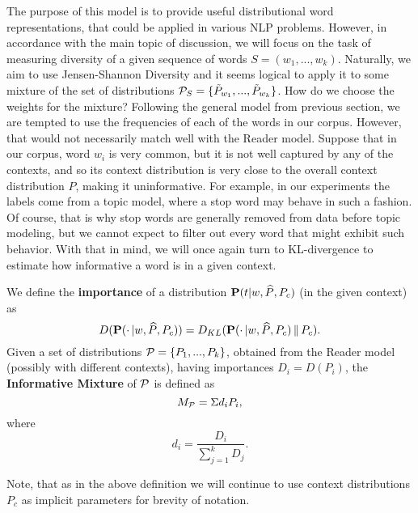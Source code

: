 The purpose of this model is to provide useful distributional
word representations, that could be applied in various NLP
problems. However, in accordance with the main topic of discussion, we will
focus on the task of measuring diversity of a given sequence of words
$S=(w_1,...,w_k)$. Naturally, we aim to use Jensen-Shannon Diversity
and it seems logical to apply it to some mixture of the set of
distributions ${\mathcal P}_S=\{\tilde{P}_{w_1},...,\tilde{P}_{w_k}\}$. How do we choose the weights
for the mixture? Following the general model from previous section, we
are tempted to use the frequencies of each of the words in our
corpus. However, that would not  
necessarily match well with the Reader model. Suppose that in our
corpus, word $w_i$ is very common, but it is not well captured by any of
the contexts, and so its context distribution is very close to the overall
context distribution $P$, making it uninformative. For example, in our
experiments the labels come from a topic model, where a stop word may
behave in such a fashion. Of course, that is why stop words are
generally removed from data before topic modeling, but we cannot
expect to filter out every word that might exhibit such behavior. With
that in mind, we will once again turn to KL-divergence to
estimate how informative a word is in a given context.

\bed
We define the {\bf importance} of a distribution $\operatorname{\mathbf{P}}(t|w,\widehat{P},P_c)$ (in 
the given context) as
\[D(\operatorname{\mathbf{P}}(\cdot\,|w,\widehat{P},P_c)) =
D_{KL}(\operatorname{\mathbf{P}}(\cdot\,|w,\widehat{P},P_c)\,\|\,P_c).\]
Given a set of distributions ${\mathcal P} = \{P_1,...,P_k\}$, obtained from the
Reader model (possibly with different contexts), having importances
$D_i=D(P_i)$, the {\bf Informative Mixture} of ${\mathcal P}$ is defined as
\[M_{{\mathcal P}} = \Sigma d_i P_i,\]
where
\[d_i = \frac{D_i}{\sum_{j=1}^k D_j}.\]
\eed

Note, that as in the above definition we will continue to use context
distributions $P_c$ as implicit parameters for brevity of notation.  

